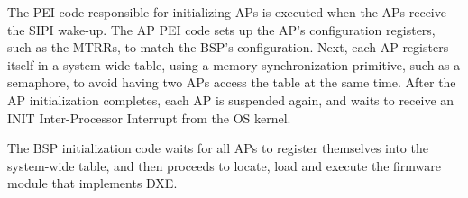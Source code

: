 
The PEI code responsible for initializing APs is executed when the APs receive
the SIPI wake-up. The AP PEI code sets up the AP's configuration registers,
such as the MTRRs, to match the BSP's configuration. Next, each AP registers
itself in a system-wide table, using a memory synchronization primitive, such
as a semaphore, to avoid having two APs access the table at the same time.
After the AP initialization completes, each AP is suspended again,
and waits to receive an INIT Inter-Processor Interrupt from the OS kernel.

The BSP initialization code waits for all APs to register themselves into the
system-wide table, and then proceeds to locate, load and execute the firmware
module that implements DXE.
